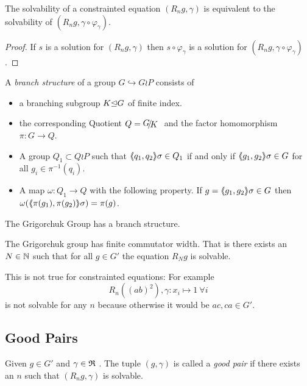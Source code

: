 \documentclass[a4paper,12pt]{article}
\begin{document}
\begin{cor}
 The solvability of a constrainted equation $(R_n g,\gamma)$ is equivalent to the solvability of $(R_n g,\gamma\circ \varphi_\gamma)$.
\end{cor}
 \begin{proof}
 If $s$ is a solution for $(R_n g,\gamma)$ then $s\circ \varphi_\gamma$ is
 a solution for $(R_n g,\gamma\circ \varphi_\gamma)$. 
\end{proof}


\begin{defi}[\cite{Bartholdi:BranchGroups}] %
A \emph{branch structure} of a group $G\hookrightarrow G \wr P$ consists of  
\begin{itemize}
 \item a branching subgroup $K{\mathrel\trianglelefteq} G$ of finite index. 
 \item the corresponding Quotient $Q=\RNK{G}{K}$ and the factor homomorphism $\pi\colon G \to Q$.
 \item A group $Q_1 \subset Q \wr P$ such that $\langle\negthickspace\langle q_1,q_2\rangle\negthickspace\rangle\sigma\in Q_1$ if and only if $\langle\negthickspace\langle g_1,g_2\rangle\negthickspace\rangle\sigma \in G$ for all $g_i \in \pi^{-1}(q_i)$.
 \item A map $\omega\colon Q_1 \to Q$ with the following property. If $g=\langle\negthickspace\langle g_1,g_2\rangle\negthickspace\rangle\sigma \in G$ then $\omega(\langle\negthickspace\langle\pi(g_1),\pi(g_2)\rangle\negthickspace\rangle\sigma) = \pi(g)$.
\end{itemize}
\end{defi}
\begin{lem}
 The Grigorchuk Group has a branch structure.
\end{lem}

\begin{thm}\label{IgorsThm}
 The Grigorchuk group has finite commutator width. That is
 there exists an $N\in\mathbb{N}$ such that for all $g\in G'$ the equation $R_Ng$ is solvable.
\end{thm}
\begin{re}
 This is not true for constrainted equations: For example
 \[R_n((ab)^2),\gamma\colon x_i\mapsto 1\ \forall i\] is not solvable for any $n$ because otherwise it would be $ac,ca\in G'$.
\end{re}

\subsection{Good Pairs}
\begin{defi}
Given $g\in G'$ and $\gamma\in\mathfrak{R}$ . The tuple $(g,\gamma)$ is called a \emph{good pair} if there exists an $n$ such that
$(R_ng,\gamma)$ is solvable.  
\end{defi}
\end{document}
